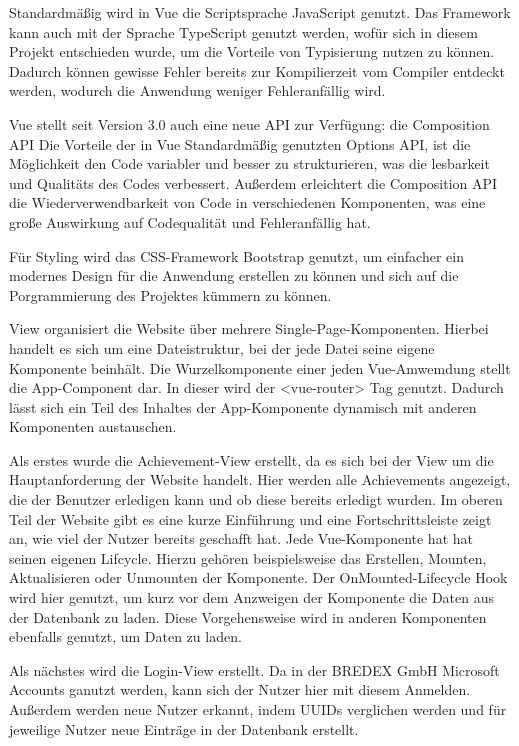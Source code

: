 \documentclass[12pt]{article}
\begin{document}
Standardmäßig wird in Vue die Scriptsprache JavaScript genutzt. Das Framework
kann auch mit der Sprache TypeScript genutzt werden, wofür sich in diesem
Projekt entschieden wurde, um die Vorteile von Typisierung nutzen zu können.
Dadurch können gewisse Fehler bereits zur Kompilierzeit vom Compiler entdeckt werden,
wodurch die Anwendung weniger Fehleranfällig wird.


Vue stellt seit Version 3.0 auch eine neue API zur Verfügung: die Composition API
Die Vorteile der in Vue Standardmäßig genutzten Options API, ist die Möglichkeit
den Code variabler und besser zu strukturieren, was die lesbarkeit und Qualitäts des
Codes verbessert. Außerdem erleichtert die Composition API die Wiederverwendbarkeit
von Code in verschiedenen Komponenten, was eine große Auswirkung auf Codequalität und
Fehleranfällig hat.

Für Styling wird das CSS-Framework Bootstrap genutzt, um einfacher ein modernes
Design für die Anwendung erstellen zu können und sich auf die Porgrammierung des
Projektes kümmern zu können.

View organisiert die Website über mehrere Single-Page-Komponenten. Hierbei handelt
es sich um eine Dateistruktur, bei der jede Datei seine eigene Komponente beinhält.
Die Wurzelkomponente einer jeden Vue-Amwemdung stellt die App-Component dar. In dieser
wird der <vue-router> Tag genutzt. Dadurch lässt sich ein Teil des Inhaltes der App-Komponente
dynamisch mit anderen Komponenten austauschen. %

Als erstes wurde die Achievement-View erstellt, da es sich bei der View um die
Hauptanforderung der Website handelt. Hier werden alle Achievements angezeigt, die
der Benutzer erledigen kann und ob diese bereits erledigt wurden.
Im oberen Teil der Website gibt es eine kurze Einführung und eine Fortschrittsleiste
zeigt an, wie viel der Nutzer bereits geschafft hat.
Jede Vue-Komponente hat
hat seinen eigenen Lifcycle. Hierzu gehören beispielsweise das Erstellen, Mounten,
Aktualisieren oder Unmounten der Komponente. Der OnMounted-Lifecycle Hook wird hier genutzt,
um kurz vor dem Anzweigen der Komponente die Daten aus der Datenbank zu laden.
Diese Vorgehensweise wird in anderen Komponenten ebenfalls genutzt, um Daten zu laden. 

Als nächstes wird die Login-View erstellt. Da in der BREDEX GmbH Microsoft Accounts
ganutzt werden, kann sich der Nutzer hier mit diesem Anmelden. Außerdem werden neue Nutzer
erkannt, indem UUIDs verglichen werden und für jeweilige Nutzer neue Einträge in der
Datenbank erstellt.
\end{document}
